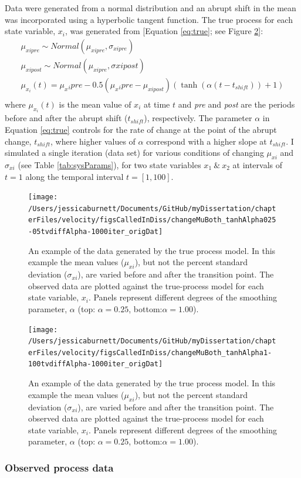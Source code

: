 \documentclass[12pt,twoside,openany]{reedthesis}
\begin{document}
Data were generated from a normal distribution and an abrupt shift in the mean was incorporated using a hyperbolic tangent function. The true process for each state variable, \(x_i\), was generated from {[}Equation \eqref{eq:true}; see Figure \ref{fig:trueObsEx}{]}:
\begin{equation}
\begin{array}{rcl}
\mu_{xipre}\sim Normal(\mu_{xipre},\sigma_{xipre}) \\ 
\mu_{xipost} \sim Normal(\mu_{xipre}, \sigma{xipost}) \\ 
\mu_{x_i}(t) = \mu_x{_ipre}  - 0.5(\mu_x{_ipre}-\mu_{xipost})(\tanh(\alpha (t-t_{shift}))+1) \\ 
\end{array}
\label{eq:true}
\end{equation}
where \(\mu_{x_i}(t)\) is the mean value of \(x_i\) at time \(t\) and \emph{pre} and \emph{post} are the periods before and after the abrupt shift (\(t_{shift}\)), respectively. The parameter \(\alpha\) in Equation \eqref{eq:true} controls for the rate of change at the point of the abrupt change, \(t_{shift}\), where higher values of \(\alpha\) correspond with a higher slope at \(t_{shift}\). I simulated a single iteration (data set) for various conditions of changing \(\mu_{xi}\) and \(\sigma_{xi}\) (see Table \ref{tab:sysParams}), for two state variables \(x_1\ \&\ x_2\) at intervals of \(t=1\) along the temporal interval \(t=[1,100]\).
\begin{figure}
\texttt{[image: /Users/jessicaburnett/Documents/GitHub/myDissertation/chapterFiles/velocity/figsCalledInDiss/changeMuBoth\_tanhAlpha025-05tvdiffAlpha-1000iter\_origDat]} \caption{An example of the data generated by the true process model. In this example the mean values ($\mu_{xi}$), but not the percent standard deviation ($\sigma_{xi}$), are varied before and after the transition point. The observed data are plotted against the true-process model for each state variable, $x_i$. Panels represent different degrees of the smoothing parameter, $\alpha$ (top: $\alpha=0.25$, bottom:$\alpha=1.00$).}\label{fig:trueObsEx}
\end{figure}
\begin{figure}
\texttt{[image: /Users/jessicaburnett/Documents/GitHub/myDissertation/chapterFiles/velocity/figsCalledInDiss/changeMuBoth\_tanhAlpha1-100tvdiffAlpha-1000iter\_origDat]} \caption{An example of the data generated by the true process model. In this example the mean values ($\mu_{xi}$), but not the percent standard deviation ($\sigma_{xi}$), are varied before and after the transition point. The observed data are plotted against the true-process model for each state variable, $x_i$. Panels represent different degrees of the smoothing parameter, $\alpha$ (top: $\alpha=0.25$, bottom:$\alpha=1.00$).}\label{fig:trueObsEx}
\end{figure}
\hypertarget{observed-process-data}{%
\subsubsection{Observed process data}\label{observed-process-data}}
\end{document}
